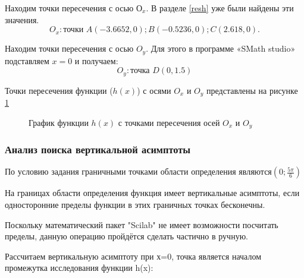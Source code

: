 \documentclass[russian,utf8,nocolumnxxxi,nocolumnxxxii]{eskdtext}
\begin{document}
Находим точки пересечения с осью $О_x$. В разделе \ref{resh}  уже были найдены эти значения. 
$$
O_x: \text{точки } A(-3.6652, 0);  B( -0.5236, 0); C(2.618, 0).
$$

Находим точки пересечения с осью $O_y$. Для этого в программе «SMath studio» подставляем $x=0$ и получаем:
$$
O_y: \text{точка } D (0, 1.5)
$$

Точки пересечения функции ($h(x)$) с осями $O_x$ и $O_y$ представлены на рисунке \ref{graf3}

 \begin{figure}[h!]
\begin{center}
\caption{График функции $h(x)$ с точками пересечения осей $O_x$ и $O_y$} \label{graf3}
\end{center}
\end{figure}

\subsubsection{Анализ поиска вертикальной асимптоты}

По условию задания граничными точками области определения являются$(0;\frac{5\pi}{6})$

На границах области определения функция имеет вертикальные асимптоты, если односторонние пределы функции в этих граничных точках бесконечны.

Поскольку математический пакет "Scilab" не имеет возможности посчитать пределы, данную операцию пройдётся сделать частично в ручную.



Рассчитаем вертикальную асимптоту при х=0, точка является началом промежутка исследования функции h(x):
\end{document}
